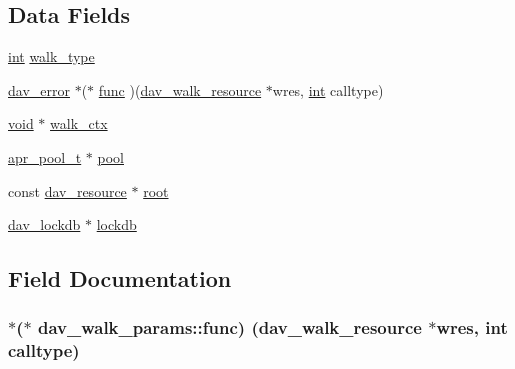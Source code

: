 \subsection*{Data Fields}
\begin{DoxyCompactItemize}
\item 
\hyperlink{pcre_8txt_a42dfa4ff673c82d8efe7144098fbc198}{int} \hyperlink{structdav__walk__params_a10c05b514a19d58e7a2874db19b97663}{walk\+\_\+type}
\item 
\hyperlink{structdav__error}{dav\+\_\+error} $\ast$($\ast$ \hyperlink{structdav__walk__params_a3a2101d369ce35dba3330205375d871f}{func} )(\hyperlink{structdav__walk__resource}{dav\+\_\+walk\+\_\+resource} $\ast$wres, \hyperlink{pcre_8txt_a42dfa4ff673c82d8efe7144098fbc198}{int} calltype)
\item 
\hyperlink{group__MOD__ISAPI_gacd6cdbf73df3d9eed42fa493d9b621a6}{void} $\ast$ \hyperlink{structdav__walk__params_a476b879ce49370324a3b150f2bfa77ea}{walk\+\_\+ctx}
\item 
\hyperlink{structapr__pool__t}{apr\+\_\+pool\+\_\+t} $\ast$ \hyperlink{structdav__walk__params_a510a9eb72f64d77f780f3a5b83e73165}{pool}
\item 
const \hyperlink{structdav__resource}{dav\+\_\+resource} $\ast$ \hyperlink{structdav__walk__params_a42b1e5b5b1a86ded12015260dc28ce89}{root}
\item 
\hyperlink{structdav__lockdb}{dav\+\_\+lockdb} $\ast$ \hyperlink{structdav__walk__params_a2e861fbd5fbcc684d61d464a7186c906}{lockdb}
\end{DoxyCompactItemize}


\subsection{Field Documentation}
\subsubsection[{\texorpdfstring{func}{func}}]{$\ast$($\ast$ dav\+\_\+walk\+\_\+params\+::func) ({\bf dav\+\_\+walk\+\_\+resource} $\ast$wres, {\bf int} calltype)}\hypertarget{structdav__walk__params_a3a2101d369ce35dba3330205375d871f}{}\label{structdav__walk__params_a3a2101d369ce35dba3330205375d871f}
